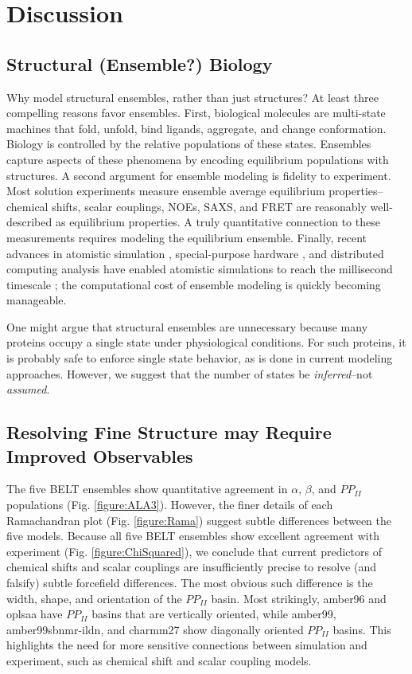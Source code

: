 \documentclass[journal=jacsat,manuscript=article]{achemso}
\begin{document}
\section{Discussion}

\subsection{Structural (Ensemble?) Biology}

Why model structural ensembles, rather than just structures?  At least three compelling reasons favor ensembles.  First, biological molecules are multi-state machines that fold, unfold, bind ligands, aggregate, and change conformation.  Biology is controlled by the relative populations of these states.  Ensembles capture aspects of these phenomena by encoding equilibrium populations with structures.  A second argument for ensemble modeling is fidelity to experiment.  Most solution experiments measure ensemble average equilibrium properties--chemical shifts, scalar couplings, NOEs, SAXS, and FRET are reasonably well-described as equilibrium properties.  A truly quantitative connection to these measurements requires modeling the equilibrium ensemble.  Finally, recent advances in atomistic simulation \cite{hess2008, pronk2013gromacs, eastman2012openmm, eastman2010openmm}, special-purpose hardware \cite{Shaw2008}, and distributed computing analysis \cite{emma, msmb2} have enabled atomistic simulations to reach 
the millisecond timescale \cite{voelz2010, bowman2011atomistic, Shaw2010, Shaw2011}; the computational cost of ensemble modeling is quickly becoming manageable.

One might argue that structural ensembles are unnecessary because many proteins occupy a single state under physiological conditions.  For such proteins, it is probably safe to enforce single state behavior, as is done in current modeling approaches. However, we suggest that the number of states be \emph{inferred}--not \emph{assumed}.  


\subsection{Resolving Fine Structure may Require Improved Observables}

The five BELT ensembles show quantitative agreement in $\alpha$, $\beta$, and $PP_{II}$ populations (Fig. \ref{figure:ALA3}).  However, the finer details of each Ramachandran plot (Fig. \ref{figure:Rama}) suggest subtle differences between the 
five models.  Because all five BELT ensembles show excellent agreement with experiment (Fig. \ref{figure:ChiSquared}), we conclude that current predictors of chemical shifts and scalar couplings are insufficiently precise to resolve (and falsify) subtle forcefield differences.  The most obvious such difference is the width, shape, and orientation of the $PP_{II}$ basin.  Most strikingly, amber96 and oplsaa have $PP_{II}$ basins that are vertically oriented, while amber99, amber99sbnmr-ildn, and charmm27 show diagonally oriented $PP_{II}$ basins.  This highlights the need for more sensitive connections between simulation and experiment, such as chemical shift and scalar coupling models.
\end{document}
